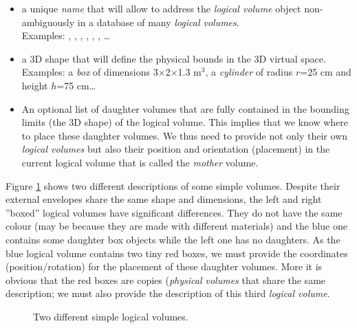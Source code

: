 \begin{itemize}

\item   a  unique  \emph{name}   that  will   allow  to   address  the
  \emph{logical volume}  object non-ambiguously in a  database of many
  \emph{logical  volumes}.\\  \pn  Examples:  ,  ,
  ,     ,     ,    ,
  \dots
  
\item  a 3D  shape that  will  define the  physical bounds  in the  3D
  virtual   space.\\  \pn   Examples:  a   \emph{box}   of  dimensions
  3$\times$2$\times$1.3 m$^3$,  a \emph{cylinder} of  radius $r$=25 cm
  and height $h$=75 cm\dots

\item An optional list of daughter volumes that are fully contained in
  the  bounding limits  (the 3D  shape)  of the  logical volume.  This
  implies that we know where  to place these daughter volumes. We thus
  need to provide  not only their own \emph{logical  volumes} but also
  their position  and orientation  (placement) in the  current logical
  volume that is called the \emph{mother} volume.

\end{itemize}

Figure \ref{fig:lv:1} shows two  different descriptions of some simple
volumes.  Despite  their external envelopes  share the same  shape and
dimensions,  the  left  and   right  ''boxed''  logical  volumes  have
significant differences.   They do  not have the  same colour  (may be
because  they are  made with  different  materials) and  the blue  one
contains  some  daughter  box  objects  while  the  left  one  has  no
daughters. As the blue logical volume contains two tiny red boxes, we must
provide the coordinates (position/rotation) for the placement of these
daughter volumes. More it is obvious that the red boxes are copies 
(\emph{physical volumes} that share the same description; we must
also provide the description of this third \emph{logical volume}.

\begin{figure}[h]
\begin{center}
\scalebox{0.75}{}
\end{center}
\caption{Two  different  simple  logical  volumes.}\label{fig:lv:1}
\end{figure}

